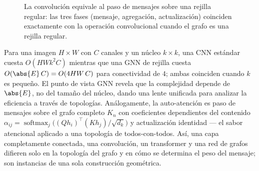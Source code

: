 \begin{figure}[h]
\centering
{}
\caption[La convoluci\'on como paso de mensajes]{La convoluci\'on equivale al paso
de mensajes sobre una rejilla regular: las tres fases (mensaje, agregaci\'on,
actualizaci\'on) coinciden exactamente con la operaci\'on convolucional cuando el
grafo es una rejilla regular.}
\label{fig:graphs:conv-mp}
\end{figure}

Para una imagen $H \times W$ con $C$ canales y un n\'ucleo $k \times k$, una CNN
est\'andar cuesta $O(HW k^2 C)$ mientras que una GNN de rejilla cuesta
$O(\abs{E}\, C) = O(4HW\, C)$ para conectividad de $4$; ambas coinciden cuando $k$
es peque\~no. El punto de vista GNN revela que la complejidad depende de
$\abs{E}$, no del tama\~no del n\'ucleo, dando una lente unificada para analizar la
eficiencia a trav\'es de topolog\'ias. An\'alogamente, la auto-atenci\'on es paso
de mensajes sobre el grafo completo $K_n$ con coeficientes dependientes del
contenido $\alpha_{ij} = \operatorname{softmax}_j\big((Q h_i)^\top (K h_j)/\sqrt{d_k}\big)$
y actualizaci\'on identidad --- el sabor atencional aplicado a una topolog\'ia de
todos-con-todos. As\'i, una capa completamente conectada, una convoluci\'on, un
transformer y una red de grafos difieren solo en la topolog\'ia del grafo y en
c\'omo se determina el peso del mensaje; son instancias de una sola construcci\'on
geom\'etrica.

